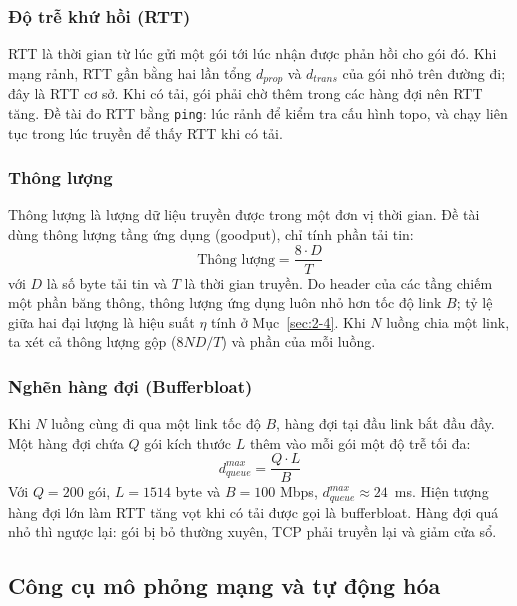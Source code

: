 \subsubsection{Độ trễ khứ hồi (RTT)}
RTT là thời gian từ lúc gửi một gói tới lúc nhận được phản hồi cho gói đó. Khi mạng rảnh, RTT gần bằng hai lần tổng $d_{prop}$ và $d_{trans}$ của gói nhỏ trên đường đi; đây là RTT cơ sở. Khi có tải, gói phải chờ thêm trong các hàng đợi nên RTT tăng. Đề tài đo RTT bằng \texttt{ping}: lúc rảnh để kiểm tra cấu hình topo, và chạy liên tục trong lúc truyền để thấy RTT khi có tải.

\subsubsection{Thông lượng}
Thông lượng là lượng dữ liệu truyền được trong một đơn vị thời gian. Đề tài dùng thông lượng tầng ứng dụng (goodput), chỉ tính phần tải tin:
\begin{equation}
    \text{Thông lượng} = \frac{8 \cdot D}{T}
    \label{eq:goodput}
\end{equation}
với $D$ là số byte tải tin và $T$ là thời gian truyền. Do header của các tầng chiếm một phần băng thông, thông lượng ứng dụng luôn nhỏ hơn tốc độ link $B$; tỷ lệ giữa hai đại lượng là hiệu suất $\eta$ tính ở Mục~\ref{sec:2-4}. Khi $N$ luồng chia một link, ta xét cả thông lượng gộp ($8ND/T$) và phần của mỗi luồng.

\subsubsection{Nghẽn hàng đợi (Bufferbloat)}
Khi $N$ luồng cùng đi qua một link tốc độ $B$, hàng đợi tại đầu link bắt đầu đầy. Một hàng đợi chứa $Q$ gói kích thước $L$ thêm vào mỗi gói một độ trễ tối đa:
\begin{equation}
    d_{queue}^{max} = \frac{Q \cdot L}{B}
    \label{eq:dqueue}
\end{equation}
Với $Q = 200$ gói, $L = 1514$ byte và $B = 100$ Mbps, $d_{queue}^{max} \approx 24$~ms. Hiện tượng hàng đợi lớn làm RTT tăng vọt khi có tải được gọi là bufferbloat. Hàng đợi quá nhỏ thì ngược lại: gói bị bỏ thường xuyên, TCP phải truyền lại và giảm cửa sổ.

\subsection{Công cụ mô phỏng mạng và tự động hóa}
\label{sec:1-5}

